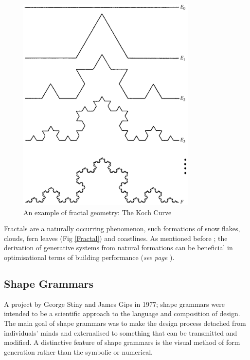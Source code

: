 \begin{figure}[htbp]
\centering
\includegraphics[width=0.8\textwidth]{./Images/9-FractalGeom}
\caption[The Koch Curve]{An example of fractal geometry: The Koch Curve \cite{falconer03}}
\label{KochCurve}
\end{figure}

Fractals are a naturally occurring phenomenon, such formations of snow flakes, clouds, fern leaves (Fig \ref{Fractal}) and coastlines. As mentioned before ; the derivation of generative systems from natural formations can be beneficial in optimisational terms of building performance (\emph{see page} \pageref{NaturalOpt}).

\clearpage
\subsection{Shape Grammars}

A project by George Stiny and James Gips in 1977; shape grammars were intended to be a scientific approach to the language and composition of design. The main goal of shape grammars was to make the design process detached from individuals' minds and externalised to something that can be transmitted and modified. A distinctive feature of shape grammars is the visual method of form generation rather than the symbolic or numerical.


